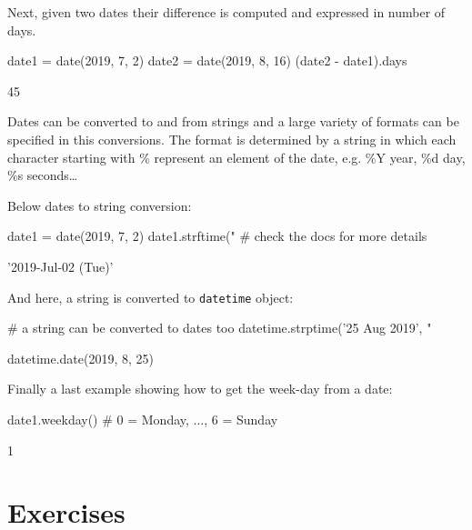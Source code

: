 Next, given two dates their difference is computed and expressed in number of days.

\begin{ipython}
date1 = date(2019, 7, 2)
date2 = date(2019, 8, 16)
(date2 - date1).days
\end{ipython}
\begin{ioutput}
45
\end{ioutput}

Dates can be converted to and from strings and a large variety of formats can be specified in this conversions. 
The format is determined by a string in which each character starting with \% represent an element 
of the date, e.g. \%Y year, \%d day, \%s seconds\ldots

Below dates to string conversion:

\begin{ipython}
date1 = date(2019, 7, 2)
date1.strftime("%
                                # check the docs for more details
\end{ipython}
\begin{ioutput}
'2019-Jul-02 (Tue)'
\end{ioutput}

And here, a string is converted to \texttt{datetime} object:

\begin{ipython}
# a string can be converted to dates too
datetime.strptime('25 Aug 2019', "%
\end{ipython}
\begin{ioutput}
datetime.date(2019, 8, 25)
\end{ioutput}

Finally a last example showing how to get the week-day from a date:

\begin{ipython}
date1.weekday() # 0 = Monday, ..., 6 = Sunday
\end{ipython}
\begin{ioutput}
1
\end{ioutput}

\section*{Exercises}

